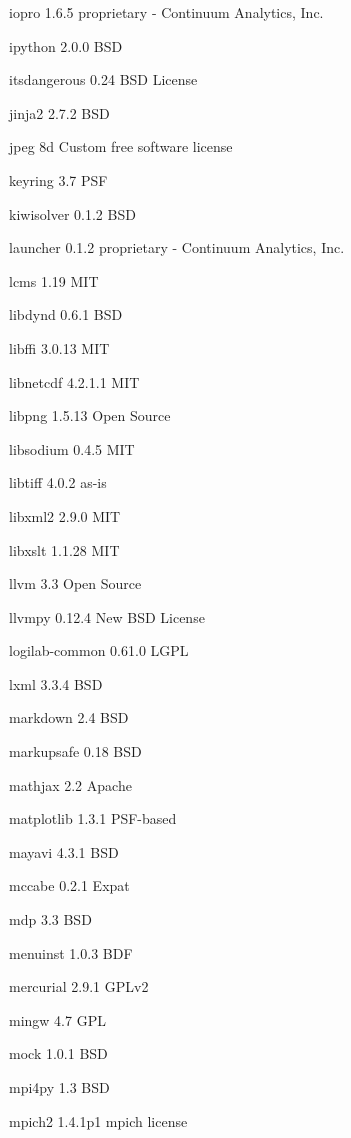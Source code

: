 \documentclass[letterpaper,10pt,openany,oneside]{sphinxmanual}
\begin{document}
\begin{DUlineblock}{0em}
\item[] iopro         1.6.5   proprietary - Continuum Analytics, Inc.
\item[] ipython       2.0.0   BSD
\item[] itsdangerous  0.24    BSD License
\item[] jinja2        2.7.2   BSD
\item[] jpeg  8d      Custom free software license
\item[] keyring       3.7     PSF
\item[] kiwisolver    0.1.2   BSD
\item[] launcher      0.1.2   proprietary - Continuum Analytics, Inc.
\item[] lcms  1.19    MIT
\item[] libdynd       0.6.1   BSD
\item[] libffi        3.0.13  MIT
\item[] libnetcdf     4.2.1.1         MIT
\item[] libpng        1.5.13  Open Source
\item[] libsodium     0.4.5   MIT
\item[] libtiff       4.0.2   as-is
\item[] libxml2       2.9.0   MIT
\item[] libxslt       1.1.28  MIT
\item[] llvm  3.3     Open Source
\item[] llvmpy        0.12.4  New BSD License
\item[] logilab-common        0.61.0  LGPL
\item[] lxml  3.3.4   BSD
\item[] markdown      2.4     BSD
\item[] markupsafe    0.18    BSD
\item[] mathjax       2.2     Apache
\item[] matplotlib    1.3.1   PSF-based
\item[] mayavi        4.3.1   BSD
\item[] mccabe        0.2.1   Expat
\item[] mdp   3.3     BSD
\item[] menuinst      1.0.3   BDF
\item[] mercurial     2.9.1   GPLv2
\item[] mingw         4.7     GPL
\item[] mock  1.0.1   BSD
\item[] mpi4py        1.3     BSD
\item[] mpich2        1.4.1p1         mpich license

\end{DUlineblock}
\end{document}
